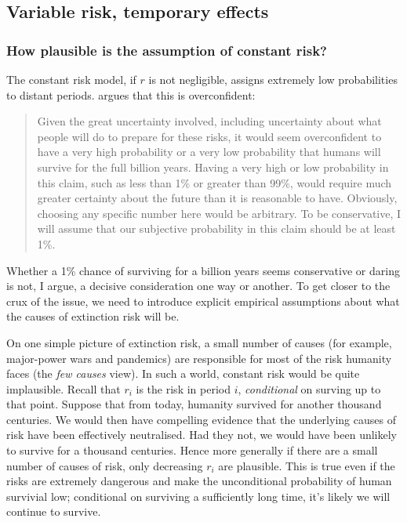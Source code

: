 \documentclass[british]{article}
\begin{document}
\subsection{Variable risk, temporary effects}\label{vr-te}

\subsubsection{How plausible is the assumption of constant risk?} The constant risk model, if $r$ is not negligible, assigns extremely low probabilities to distant periods. \cite{beckstead_overwhelming_2013-2} argues that this is overconfident:

\begin{quote}
Given the great uncertainty involved, including uncertainty about what
people will do to prepare for these risks, it would seem overconfident
to have a very high probability or a very low probability that humans
will survive for the full billion years. Having a very high or low
probability in this claim, such as less than 1\% or greater than 99\%,
would require much greater certainty about the future than it is
reasonable to have. Obviously, choosing any specific number here would
be arbitrary. To be conservative, I will assume that our subjective
probability in this claim should be at least 1\%.
\end{quote}

Whether a 1\% chance of surviving for a billion years seems conservative or daring is not, I argue, a decisive consideration one way or another. To get closer to the crux of the issue, we need to introduce explicit empirical assumptions about what the causes of extinction risk will be.

On one simple picture of extinction risk, a small number of causes (for example, major-power wars and pandemics) are responsible for most of the risk humanity faces (the \emph{few causes} view).  In such a world, constant risk would be quite implausible. Recall that $r_i$ is the risk in period $i$, \emph{conditional} on surving up to that point. Suppose that from today, humanity survived for another thousand centuries. We would then have compelling evidence that the underlying causes of risk have been effectively neutralised. Had they not, we would have been unlikely to survive for a thousand centuries. Hence more generally if there are a small number of causes of risk, only decreasing $r_i$ are plausible. This is true even if the risks are extremely dangerous and make the unconditional probability of human survivial low; conditional on surviving a sufficiently long time, it's likely we will continue to survive.
\end{document}

